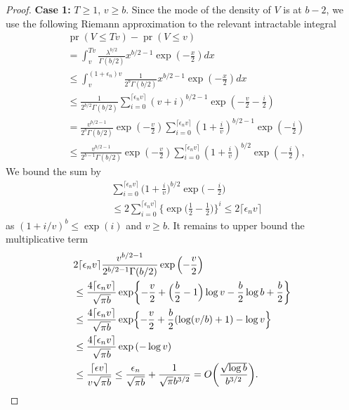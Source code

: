 \documentclass[10pt,a4paper]{amsart}
\newcommand{\pr}{\mathop{\mathrm{pr}}}
\begin{document}
\begin{proof}
	\noindent    \textbf{Case 1:} $T \geq 1$, $v \geq b$. Since the mode of the density of $V$ is at $b - 2$, we use the following Riemann approximation to the relevant intractable integral
	\begin{align*}
		&\pr\left( V \leq Tv \right) - \pr(V \leq v) 
		\\
		&= \int_{v}^{Tv} \frac{\lambda^{b/2}}{\Gamma(b/2)} x^{b/2-1} \exp\left( -\frac{x}{2} \right) dx    \\
		&\leq \int_{v}^{(1 +\epsilon_n)v} \frac{1}{2^b\Gamma(b/2)} x^{b/2-1} \exp\left( -\frac{x}{2} \right) dx\\
		&\leq \frac{1}{2^{b/2}\Gamma(b/2)} \sum^{ \lceil \epsilon_n v \rceil}_{  i = 0}  (v+i )^{b/2-1} \exp\left( -\frac{ v }{2} - \frac{i}{2} \right)\\
		&= \frac{v^{b/2-1}}{2^b\Gamma(b/2)} \exp\left( -\frac{ v }{2} \right) \sum^{ \lceil \epsilon_n v \rceil}_{  i = 0}  \left(1+ \frac{i}{v} \right)^{b/2-1} \exp\left(- \frac{i}{2} \right) \\
		&\leq \frac{v^{b/2-1}}{2^{b-1}\Gamma(b/2)} \exp\left( -\frac{ v }{2} \right) \sum^{ \lceil \epsilon_n v \rceil}_{  i = 0}  \left(1+ \frac{i}{v} \right)^{b/2} \exp\left(- \frac{i}{2} \right), 
	\end{align*}
	We bound the sum by
	\begin{align*}
		&\sum^{\lceil \epsilon_n v \rceil}_{  i = 0}  \biggl(1+ \frac{i}{v} \biggr)^{b/2} \exp\biggl(- \frac{i}{2} \biggr)\\
		&\leq 2 \sum^{\lceil \epsilon_n v \rceil}_{  i = 0} \biggl\{ \exp\biggl( \frac{1}{2} - \frac{1}{2} \biggr) \biggr\}^i  \leq 2\lceil \epsilon_n v \rceil
	\end{align*}
	as $(1 + i/v)^b \leq \exp(i)$ and $v \geq b$. It remains to upper bound the multiplicative term 
	\begin{align*}
		&2\lceil \epsilon_n v \rceil\frac{v^{b/2-1}}{2^{b/2-1}\Gamma(b/2)} \exp\left( -\frac{v}{2}\right)\\
		&\leq \frac{4\lceil \epsilon_n v \rceil}{\sqrt{\pi b}} \exp\biggl\{-\frac{v}{2} + \Bigl(\frac{b}{2} - 1\Bigr) \log v -\frac{b}{2}\log b + \frac{b}{2}\biggr\} \\
		&\leq \frac{4\lceil \epsilon_n v \rceil}{\sqrt{\pi b}} \exp\Bigl\{-\frac{v}{2} + \frac{b}{2} (\log(v/b) + 1)  - \log v\Bigr\}\\
		&\leq \frac{4\lceil \epsilon_n v \rceil}{\sqrt{\pi b}} \exp\left( - \log v \right)\\
		&\leq \frac{\lceil\epsilon v \rceil}{v \sqrt{\pi b}} \leq \frac{\epsilon_n }{\sqrt{\pi b}} + \frac{1 }{\sqrt{\pi} b^{3/2}} = O\biggl( \frac{\sqrt{\log b}}{b^{3/2}} \biggr).
	\end{align*}   
	

\end{proof}
\end{document}
